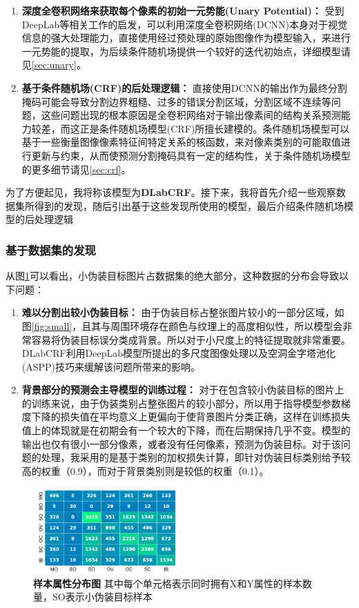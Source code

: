 \documentclass[a4paper,12pt]{ctexart}
\begin{document}
\begin{enumerate}
    \item \textbf{深度全卷积网络来获取每个像素的初始一元势能(Unary Potential)：} 受到DeepLab\cite{Chen2016DeepLabSI}等相关工作的启发，可以利用深度全卷积网络(DCNN)本身对于视觉信息的强大处理能力，直接使用经过预处理的原始图像作为模型输入，来进行一元势能的提取，为后续条件随机场提供一个较好的迭代初始点，详细模型请见\ref{sec:unary}。
    \item \textbf{基于条件随机场(CRF)的后处理逻辑：} 直接使用DCNN的输出作为最终分割掩码可能会导致分割边界粗糙、过多的错误分割区域，分割区域不连续等问题，这些问题出现的根本原因是全卷积网络对于输出像素间的结构关系预测能力较差，而这正是条件随机场模型(CRF)所擅长建模的。条件随机场模型可以基于一些衡量图像像素特征间特定关系的核函数，来对像素类别的可能取值进行更新与约束，从而使预测分割掩码具有一定的结构性，关于条件随机场模型的更多细节请见\ref{sec:crf}。
\end{enumerate}

为了方便起见，我将称该模型为\textbf{DLabCRF}。接下来，我将首先介绍一些观察数据集所得到的发现，随后引出基于这些发现所使用的模型，最后介绍条件随机场模型的后处理逻辑

\subsubsection{基于数据集的发现}
从图\ref{fig:small_dist}可以看出，小伪装目标图片占数据集的绝大部分，这种数据的分布会导致以下问题：
\begin{enumerate}
    \item \textbf{难以分割出较小伪装目标：} 由于伪装目标占整张图片较小的一部分区域，如图\ref{fig:small}，且其与周围环境存在颜色与纹理上的高度相似性，所以模型会非常容易将伪装目标误分类成背景。所以对于小尺度上的特征提取就非常重要。DLabCRF利用DeepLab模型所提出的多尺度图像处理以及空洞金字塔池化(ASPP)技巧来缓解该问题所带来的影响。
	\item \textbf{背景部分的预测会主导模型的训练过程：} 对于在包含较小伪装目标的图片上的训练来说，由于伪装类别占整张图片的较小部分，所以用于指导模型参数梯度下降的损失值在平均意义上更偏向于使背景图片分类正确，这样在训练损失值上的体现就是在初期会有一个较大的下降，而在后期保持几乎不变。模型的输出也仅有很小一部分像素，或者没有任何像素，预测为伪装目标。对于该问题的处理，我采用的是基于类别的加权损失计算，即针对伪装目标类别给予较高的权重（0.9），而对于背景类别则是较低的权重（0.1）。
\end{enumerate}

\begin{figure}
    
    \centering
    \includegraphics[width=0.5\textwidth]{figures/small_dist.png}
    \caption{\textbf{样本属性分布图} 其中每个单元格表示同时拥有X和Y属性的样本数量，SO表示小伪装目标样本\label{fig:small_dist}}
\end{figure}
\end{document}
